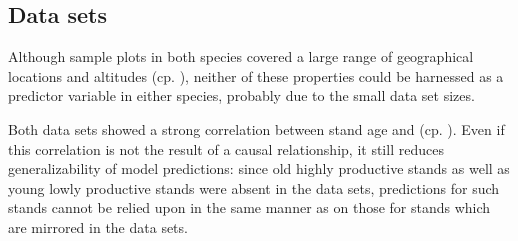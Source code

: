 \subsection{Data sets}

Although sample plots in both species covered a large range of geographical locations and altitudes (cp. ), neither of these properties could be harnessed as a predictor variable in either species, probably due to the small data set sizes.

Both data sets showed a strong correlation between stand age and \ProductivityIndexText{} (cp. ). Even if this correlation is not the result of a causal relationship, it still reduces generalizability of model predictions:  since old highly productive stands as well as young lowly productive stands were absent in the data sets, predictions for such stands cannot be relied upon in the same manner as on those for stands which are mirrored in the data sets.  

